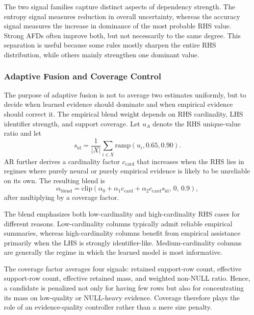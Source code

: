 \documentclass[conference]{IEEEtran}
\begin{document}
The two signal families capture distinct aspects of dependency strength. The entropy signal measures reduction in overall uncertainty, whereas the accuracy signal measures the increase in dominance of the most probable RHS value. Strong AFDs often improve both, but not necessarily to the same degree. This separation is useful because some rules mostly sharpen the entire RHS distribution, while others mainly strengthen one dominant value.

\subsubsection{Adaptive Fusion and Coverage Control}

The purpose of adaptive fusion is not to average two estimates uniformly, but to decide when learned evidence should dominate and when empirical evidence should correct it. The empirical blend weight depends on RHS cardinality, LHS identifier strength, and support coverage. Let $u_A$ denote the RHS unique-value ratio and let
\begin{equation}
    s_{\mathrm{id}} = \frac{1}{|X|}\sum_{i\in X}\mathrm{ramp}(u_i, 0.65, 0.90).
\end{equation}
AR further derives a cardinality factor $c_{\mathrm{card}}$ that increases when the RHS lies in regimes where purely neural or purely empirical evidence is likely to be unreliable on its own. The resulting blend is
\begin{equation}
    \alpha_{\mathrm{blend}} = \mathrm{clip}\!\left(\alpha_0 + \alpha_1 c_{\mathrm{card}} + \alpha_2 c_{\mathrm{card}} s_{\mathrm{id}},\, 0,\, 0.9\right),
\end{equation}
after multiplying by a coverage factor.

The blend emphasizes both low-cardinality and high-cardinality RHS cases for different reasons. Low-cardinality columns typically admit reliable empirical summaries, whereas high-cardinality columns benefit from empirical assistance primarily when the LHS is strongly identifier-like. Medium-cardinality columns are generally the regime in which the learned model is most informative.

The coverage factor averages four signals: retained support-row count, effective support-row count, effective retained mass, and weighted non-NULL ratio. Hence, a candidate is penalized not only for having few rows but also for concentrating its mass on low-quality or NULL-heavy evidence. Coverage therefore plays the role of an evidence-quality controller rather than a mere size penalty.
\end{document}
